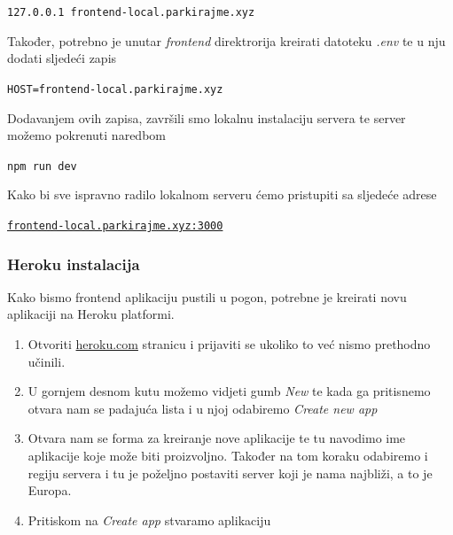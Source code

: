 								\begin{center}
										\texttt{127.0.0.1	frontend-local.parkirajme.xyz}
								\end{center}

								Također, potrebno je unutar \textit{frontend} direktrorija kreirati datoteku \textit{.env} te u nju dodati sljedeći zapis

								\begin{center}
										\texttt{HOST=frontend-local.parkirajme.xyz}
								\end{center}
								
								Dodavanjem ovih zapisa, završili smo lokalnu instalaciju servera te server možemo pokrenuti naredbom
								
								\begin{center}
										\texttt{npm run dev}
								\end{center}
								
								Kako bi sve ispravno radilo lokalnom serveru ćemo pristupiti sa sljedeće adrese

								\begin{center}
										\href{http://frontend-local.parkirajme.xyz:3000/}{\texttt{frontend-local.parkirajme.xyz:3000}}
								\end{center}
		             
						\pagebreak
		    
						\subsubsection*{Heroku instalacija}
	        
								Kako bismo frontend aplikaciju pustili u pogon, potrebne je kreirati novu aplikaciji na Heroku platformi.
								
								\begin{enumerate}
									\item Otvoriti \href{https://dashboard.heroku.com/apps}{heroku.com} stranicu i prijaviti se ukoliko to već nismo prethodno učinili.
									\item U gornjem desnom kutu možemo vidjeti gumb \textit{New} te kada ga pritisnemo otvara nam se padajuća lista i u njoj odabiremo \textit{Create new app}
									\item Otvara nam se forma za kreiranje nove aplikacije te tu navodimo ime aplikacije koje može biti proizvoljno. Također na tom koraku odabiremo i regiju servera i tu je poželjno postaviti server koji je nama najbliži, a to je Europa.
									\item Pritiskom na \textit{Create app} stvaramo aplikaciju
		        		\end{enumerate}
		        
